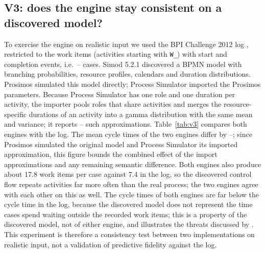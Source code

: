 \documentclass[preprint,12pt,nonatbib]{elsarticle}
\providecommand{\VthreeCases}{--}\providecommand{\VthreeLogCycle}{--}\providecommand{\VthreeOwnCycle}{--}\providecommand{\VthreeProCycle}{--}\providecommand{\VthreeDiff}{--}\providecommand{\VthreeApprox}{--}
\newcommand{\tool}{Process Simulator}
\begin{document}
\begin{table}[t]
\centering\small
\caption{V2: \tool{} versus Prosimos, mean times in seconds and relative difference with 95\,\% confidence interval.}
\label{tab:v2}
\resizebox{\linewidth}{!}{}
\end{table}

\subsection{V3: does the engine stay consistent on a discovered model?}
\label{sec:v3}
To exercise the engine on realistic input we used the BPI Challenge 2012 log \citep{bpic2012}, restricted to the work items (activities starting with \texttt{W\_}) with start and completion events, i.e.\ \VthreeCases{} cases. Simod 5.2.1 \citep{camargo2020} discovered a BPMN model with branching probabilities, resource profiles, calendars and duration distributions. Prosimos simulated this model directly; \tool{} imported the Prosimos parameters. Because \tool{} has one role and one duration per activity, the importer pools roles that share activities and merges the resource-specific durations of an activity into a gamma distribution with the same mean and variance; it reports \VthreeApprox{} such approximations. Table~\ref{tab:v3} compares both engines with the log. The mean cycle times of the two engines differ by \VthreeDiff; since Prosimos simulated the original model and \tool{} its imported approximation, this figure bounds the combined effect of the import approximations and any remaining semantic difference. Both engines also produce about 17.8 work items per case against 7.4 in the log, so the discovered control flow repeats activities far more often than the real process; the two engines agree with each other on this as well. The cycle times of both engines are far below the cycle time in the log, because the discovered model does not represent the time cases spend waiting outside the recorded work items; this is a property of the discovered model, not of either engine, and illustrates the threats discussed by \citet{bluemel2026}. This experiment is therefore a consistency test between two implementations on realistic input, not a validation of predictive fidelity against the log.

\begin{table}[t]
\centering\small
\caption{V3: BPI Challenge 2012 work items, log versus simulation of the discovered model, ten replications each (mean $\pm$ half-width of the 95\,\% confidence interval).}
\label{tab:v3}
\end{table}
\end{document}
